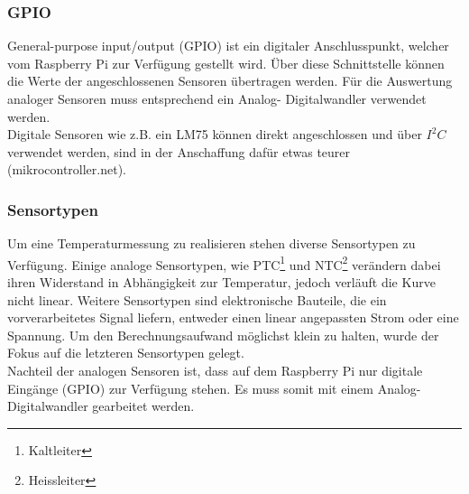 \subsubsection{GPIO}
General-purpose input/output (GPIO) ist ein digitaler Anschlusspunkt, welcher vom Raspberry Pi zur Verfügung gestellt wird. Über diese Schnittstelle können die Werte der angeschlossenen Sensoren übertragen werden. Für die Auswertung analoger Sensoren muss entsprechend ein Analog- Digitalwandler verwendet werden.\\
Digitale Sensoren wie z.B. ein LM75 können direkt angeschlossen und über $I^2C$ verwendet werden, sind in der Anschaffung dafür etwas teurer (mikrocontroller.net).

\subsubsection{Sensortypen}
Um eine Temperaturmessung zu realisieren stehen diverse Sensortypen zu Verfügung. Einige analoge Sensortypen, wie PTC\footnote{Kaltleiter} und NTC\footnote{Heissleiter} verändern dabei ihren Widerstand in Abhängigkeit zur Temperatur, jedoch verläuft die Kurve nicht linear. Weitere Sensortypen sind elektronische Bauteile, die ein vorverarbeitetes Signal liefern, entweder einen linear angepassten Strom oder eine Spannung. Um den Berechnungsaufwand möglichst klein zu halten, wurde der Fokus auf die letzteren Sensortypen gelegt.\\
Nachteil der analogen Sensoren ist, dass auf dem Raspberry Pi nur digitale Eingänge (GPIO) zur Verfügung stehen. Es muss somit  mit einem Analog- Digitalwandler gearbeitet werden.


